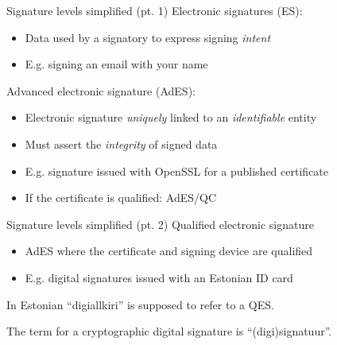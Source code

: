 \begin{frame}{Signature levels simplified (pt. 1)}
  \pause
  Electronic signatures (ES):
  \begin{itemize}[<+(1)->]
    \item Data used by a signatory to express signing \emph{intent}
    \item E.g. signing an email with your name
  \end{itemize}

  \vspace*{1em}

  \pause
  Advanced electronic signature (AdES):
  \begin{itemize}[<+(1)->]
    \item Electronic signature \emph{uniquely} linked to an \emph{identifiable} entity
    \item Must assert the \emph{integrity} of signed data
    \item E.g. signature issued with OpenSSL for a published certificate
    \item If the certificate is qualified: AdES/QC
  \end{itemize}
\end{frame}

\begin{frame}{Signature levels simplified (pt. 2)}
  \pause
  Qualified electronic signature
  \begin{itemize}[<+(1)->]
    \item AdES where the certificate and signing device are qualified
    \item E.g. digital signatures issued with an Estonian ID card
  \end{itemize}

  \vspace*{1em}

  \pause
  In Estonian \enquote{digiallkiri} is supposed to refer to a QES.

  The term for a cryptographic digital signature is \enquote{(digi)signatuur}.
\end{frame}

